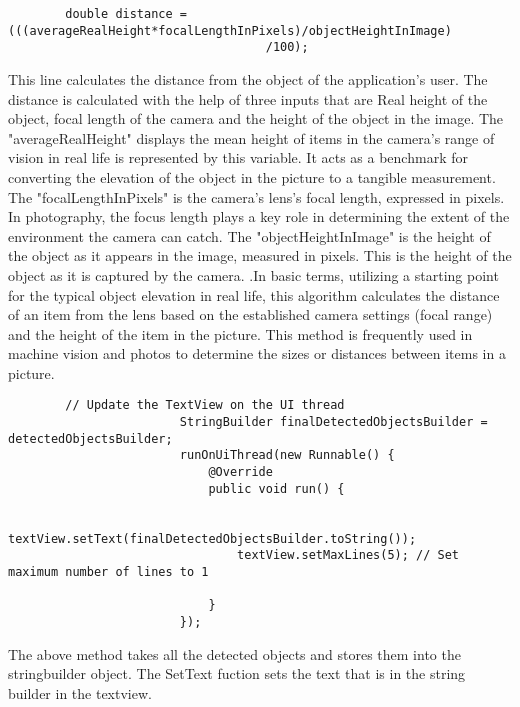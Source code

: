 \documentclass[MScCS]{uccthesis}
\begin{document}
\begin{scriptsize}
    \begin{verbatim}
        double distance =  (((averageRealHeight*focalLengthInPixels)/objectHeightInImage)
                                    /100);
    \end{verbatim}
\end{scriptsize}

This line calculates the distance from the object of the application's user. The distance is calculated with the help of three inputs that are Real height of the object, focal length of the camera and the height of the object in the image. The "averageRealHeight" displays the mean height of items in the camera's range of vision in real life is represented by this variable. It acts as a benchmark for converting the elevation of the object in the picture to a tangible measurement. The "focalLengthInPixels" is the camera's lens's focal length, expressed in pixels. In photography, the focus length plays a key role in determining the extent of the environment the camera can catch. The "objectHeightInImage"  is the height of the object as it appears in the image, measured in pixels. This is the height of the object as it is captured by the camera.
.In basic terms, utilizing a starting point for the typical object elevation in real life, this algorithm calculates the distance of an item from the lens based on the established camera settings (focal range) and the height of the item in the picture. This method is frequently used in machine vision and photos to determine the sizes or distances between items in a picture.


\begin{scriptsize}
    \begin{verbatim}
        // Update the TextView on the UI thread
                        StringBuilder finalDetectedObjectsBuilder = detectedObjectsBuilder;
                        runOnUiThread(new Runnable() {
                            @Override
                            public void run() {

                                textView.setText(finalDetectedObjectsBuilder.toString());
                                textView.setMaxLines(5); // Set maximum number of lines to 1

                            }
                        });
    \end{verbatim}
\end{scriptsize}                 

The above method takes all the detected objects and stores them into the stringbuilder object. The SetText fuction sets the text that is in the string builder in the textview.
\end{document}
